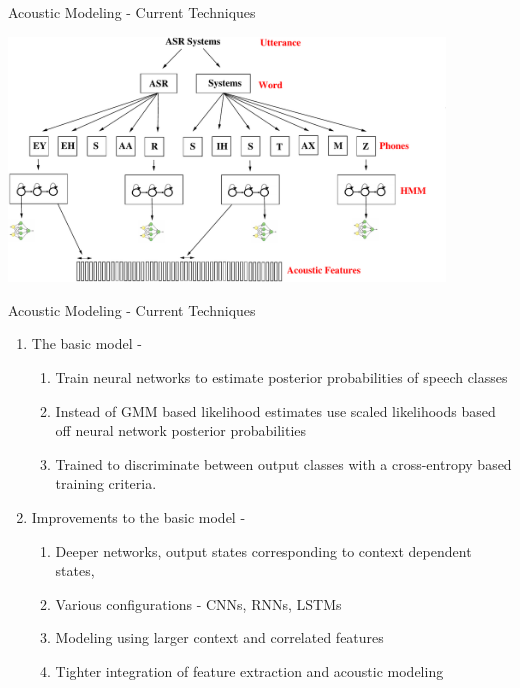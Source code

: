 \begin{frame}{Acoustic Modeling - Current Techniques}
\begin{center}
\includegraphics[height=65mm]{figures/am-mlp}
\end{center}
\end{frame}

\begin{frame}{Acoustic Modeling - Current Techniques}
\begin{enumerate}
\item The \alert{basic} model -
\begin{enumerate}
\item Train neural networks to estimate posterior probabilities of speech classes
\item Instead of GMM based likelihood estimates use scaled likelihoods based
off neural network posterior probabilities
\item Trained to discriminate between output classes with a cross-entropy
based training criteria.
\end{enumerate}
\item \alert{Improvements to the basic model} -
\begin{enumerate}
\item Deeper networks, output states corresponding to context dependent states, 
\item Various configurations - CNNs, RNNs, LSTMs
\item Modeling using larger context and correlated features
\item Tighter integration of feature extraction and acoustic modeling
\end{enumerate}
\end{enumerate}
\end{frame}

